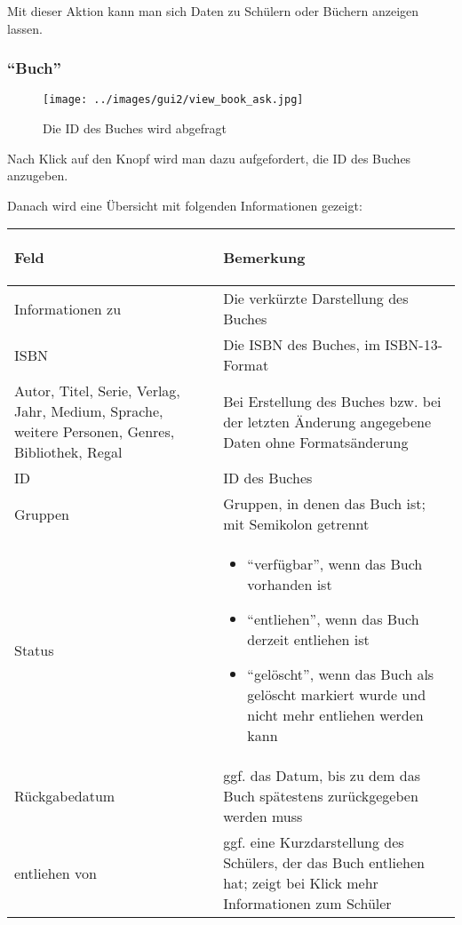 Mit dieser Aktion kann man sich Daten zu Schülern oder Büchern anzeigen lassen.

\subsubsection{``Buch''}
\label{subsubsec:detail:view:book}
\begin{figure}\texttt{[image: ../images/gui2/view\_book\_ask.jpg]}\caption{Die ID des Buches wird abgefragt}\label{fig:view_book_ask}\end{figure}

Nach Klick auf den Knopf wird man dazu aufgefordert, die ID des Buches anzugeben.

Danach wird eine Übersicht mit folgenden Informationen gezeigt:

\begin{tabular}{|p{}|p{}|}\hline
\begin{center}Feld\end{center} & \begin{center}Bemerkung\end{center}\\
\hline
Informationen zu & Die verkürzte Darstellung des Buches\\
\hline
ISBN & Die ISBN des Buches, im ISBN-13-Format\\
\hline
Autor, Titel, Serie, Verlag, Jahr, Medium, Sprache, weitere Personen, Genres, Bibliothek, Regal & Bei Erstellung des Buches bzw. bei der letzten Änderung angegebene Daten ohne Formatsänderung\\
\hline
ID & ID des Buches\\
\hline
Gruppen & Gruppen, in denen das Buch ist; mit Semikolon getrennt\\
\hline
Status & 
\begin{itemize}[leftmargin=*]
\item ``verfügbar'', wenn das Buch vorhanden ist
\item ``entliehen'', wenn das Buch derzeit entliehen ist
\item ``gelöscht'', wenn das Buch als gelöscht markiert wurde und nicht mehr entliehen werden kann
\end{itemize}
\\
\hline
Rückgabedatum & ggf. das Datum, bis zu dem das Buch spätestens zurückgegeben werden muss\\
\hline
entliehen von & ggf. eine Kurzdarstellung des Schülers, der das Buch entliehen hat; zeigt bei Klick mehr Informationen zum Schüler\\
\hline
\end{tabular}

